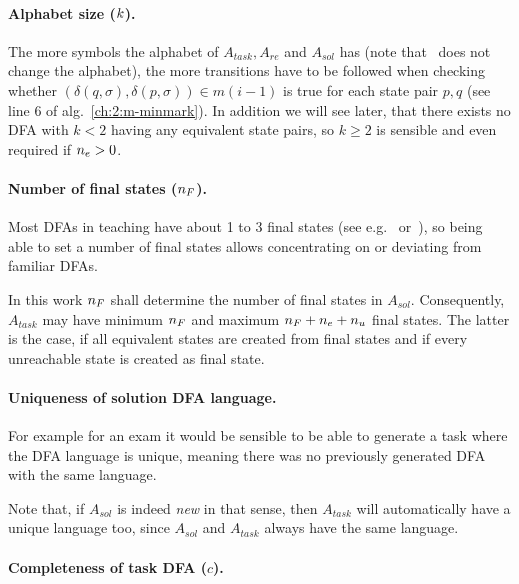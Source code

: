 \paragraph*{Alphabet size \texorpdfstring{($k$)}{}.}

The more symbols the alphabet of $A_{task}, A_{re}$ and $A_{sol}$ has (note that \MinAlg\ does not change the alphabet), the more transitions have to be followed when checking whether $(\delta(q,\sigma),\delta(p,\sigma))\in m(i-1)$ is true for each state pair $p,q$ (see line 6 of alg.~\ref{ch:2:m-minmark}). In addition we will see later, that there exists no DFA with $k<2$ having any equivalent state pairs, so $k\ge 2$ is sensible and even required if ${n_e} > 0$.

\paragraph*{Number of final states \texorpdfstring{(${n_F}$)}{}.}

Most DFAs in teaching have about 1 to 3 final states (see e.g.~\cite[pp. 48-78]{HMU01} or~\cite[pp. 28-48]{Sch01}), so being able to set a number of final states allows concentrating on or deviating from familiar DFAs.

In this work ${n_F}$ shall determine the number of final states in $A_{sol}$. Consequently, $A_{task}$ may have minimum ${n_F}$ and maximum ${n_F} + {n_e} + {n_u}$ final states. The latter is the case, if all equivalent states are created from final states and if every unreachable state is created as final state.

\paragraph*{Uniqueness of solution DFA language.}

For example for an exam it would be sensible to be able to generate a task where the DFA language is unique, meaning there was no previously generated DFA with the same language.

Note that, if $A_{sol}$ is indeed \emph{new} in that sense, then $A_{task}$ will automatically have a unique language too, since $A_{sol}$ and $A_{task}$ always have the same language.

\paragraph*{Completeness of task DFA \texorpdfstring{($c$)}{}.}

